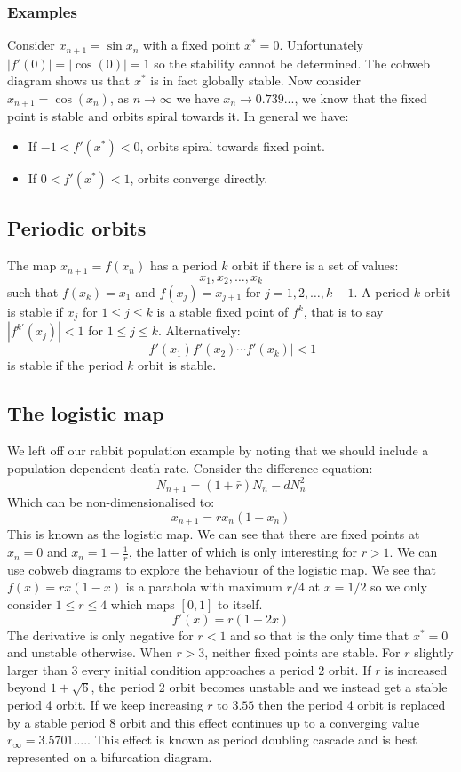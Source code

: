 \documentclass[12pt]{article}
\begin{document}
\subsubsection*{Examples}
Consider \(x_{n+1}=\sin{x_n}\) with a fixed point \(x^*=0\). Unfortunately \(|f'(0)|=|\cos(0)|=1\) so the stability cannot be determined. The cobweb diagram shows us that \(x^*\) is in fact globally stable. Now consider \(x_{n+1}=\cos(x_n)\), as \(n\to\infty\) we have \(x_n\to 0.739...\), we know that the fixed point is stable and orbits spiral towards it. In general we have:
\begin{itemize}
    \item If \(-1<f'(x^*)<0\), orbits spiral towards fixed point.
    \item If \(0<f'(x^*)<1\), orbits converge directly.
\end{itemize}
\subsection*{Periodic orbits}
The map \(x_{n+1}=f(x_n)\) has a period \(k\) orbit if there is a set of values:
\[x_1,x_2,\dots,x_k\]
such that \(f(x_k)=x_1\) and \(f(x_j)=x_{j+1}\) for \(j=1,2,\dots, k-1\). A period \(k\) orbit is stable if \(x_j\) for \(1\leq j\leq k\) is a stable fixed point of \(f^k\), that is to say \(|f^{k'}(x_j)|<1\) for \(1\leq j\leq k\). Alternatively:
\[|f'(x_1)f'(x_2)\cdots f'(x_k)|<1\]
is stable if the period \(k\) orbit is stable.
\subsection*{The logistic map}
We left off our rabbit population example by noting that we should include a population dependent death rate. Consider the difference equation:
\[N_{n+1}=(1+\bar{r})N_n-dN_n^2\]
Which can be non-dimensionalised to:
\[x_{n+1}=rx_n(1-x_n)\]
This is known as the logistic map. We can see that there are fixed points at \(x_n=0\) and \(x_n=1-\frac{1}{r}\), the latter of which is only interesting for \(r>1\). We can use cobweb diagrams to explore the behaviour of the logistic map. We see that \(f(x)=rx(1-x)\) is a parabola with maximum \(r/4\) at \(x=1/2\) so we only consider \(1\leq r\leq 4\) which maps \([0,1]\) to itself.
\[f'(x)=r(1-2x)\]
The derivative is only negative for \(r<1\) and so that is the only time that \(x^*=0\) and unstable otherwise. When \(r>3\), neither fixed points are stable. For \(r\) slightly larger than \(3\) every initial condition approaches a period 2 orbit. If \(r\) is increased beyond \(1+\sqrt{6}\), the period 2 orbit becomes unstable and we instead get a stable period 4 orbit. If we keep increasing \(r\) to \(3.55\) then the period 4 orbit is replaced by a stable period \(8\) orbit and this effect continues up to a converging value \(r_{\infty}=3.5701....\). This effect is known as period doubling cascade and is best represented on a bifurcation diagram.
\end{document}
